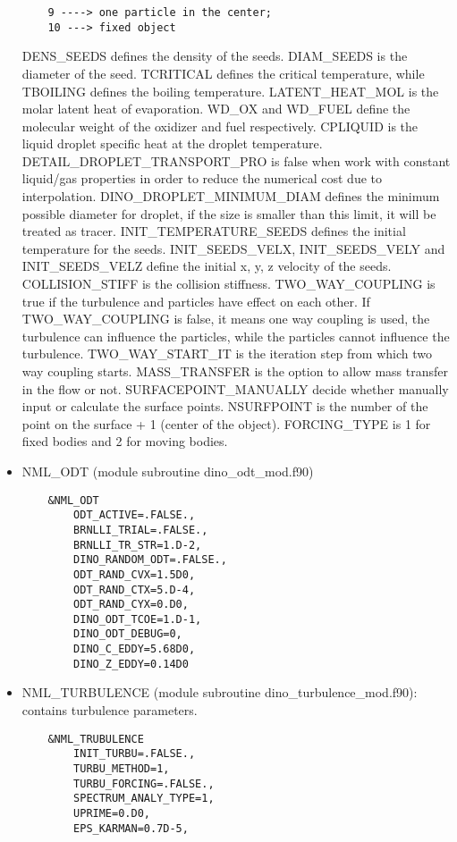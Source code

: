 \begin{itemize}
\begin{lstlisting}
    9 ----> one particle in the center;
    10 ---> fixed object
  \end{lstlisting}
  DENS\_SEEDS defines the density of the seeds. DIAM\_SEEDS is the diameter of the seed. TCRITICAL defines the critical temperature, while TBOILING defines the boiling temperature. LATENT\_HEAT\_MOL is the molar latent heat of evaporation. WD\_OX and WD\_FUEL define the molecular weight of the oxidizer and fuel respectively. CPLIQUID is the liquid droplet specific heat at the droplet temperature. DETAIL\_DROPLET\_TRANSPORT\_PRO is false when work with constant liquid/gas properties in order to reduce the numerical cost due to interpolation. DINO\_DROPLET\_MINIMUM\_DIAM defines the minimum possible diameter for droplet, if the size is smaller than this limit, it will be treated as tracer. INIT\_TEMPERATURE\_SEEDS defines the initial temperature for the seeds. INIT\_SEEDS\_VELX, INIT\_SEEDS\_VELY and INIT\_SEEDS\_VELZ define the initial x, y, z velocity of the seeds. COLLISION\_STIFF is the collision stiffness. TWO\_WAY\_COUPLING is true if the turbulence and particles have effect on each other. If TWO\_WAY\_COUPLING is false, it means one way coupling is used, the turbulence can influence the particles, while the particles cannot influence the turbulence.
  TWO\_WAY\_START\_IT is the iteration step from which two way coupling starts. MASS\_TRANSFER is the option to allow mass transfer in the flow or not. SURFACEPOINT\_MANUALLY decide whether manually input or calculate the surface points. NSURFPOINT is the number of the point on the surface + 1 (center of the object). FORCING\_TYPE is 1 for fixed bodies and 2 for moving bodies.
  \item NML\_ODT (module subroutine dino\_odt\_mod.f90)
  \begin{lstlisting}
    &NML_ODT
        ODT_ACTIVE=.FALSE.,
        BRNLLI_TRIAL=.FALSE.,
        BRNLLI_TR_STR=1.D-2,
        DINO_RANDOM_ODT=.FALSE.,
        ODT_RAND_CVX=1.5D0,
        ODT_RAND_CTX=5.D-4,
        ODT_RAND_CYX=0.D0,
        DINO_ODT_TCOE=1.D-1,
        DINO_ODT_DEBUG=0,
        DINO_C_EDDY=5.68D0,
        DINO_Z_EDDY=0.14D0
  \end{lstlisting}
  \item NML\_TURBULENCE (module subroutine dino\_turbulence\_mod.f90): contains turbulence parameters.
  \begin{lstlisting}
    &NML_TRUBULENCE
        INIT_TURBU=.FALSE.,
        TURBU_METHOD=1,
        TURBU_FORCING=.FALSE.,
        SPECTRUM_ANALY_TYPE=1,
        UPRIME=0.D0,
        EPS_KARMAN=0.7D-5,

\end{lstlisting}
\end{itemize}
